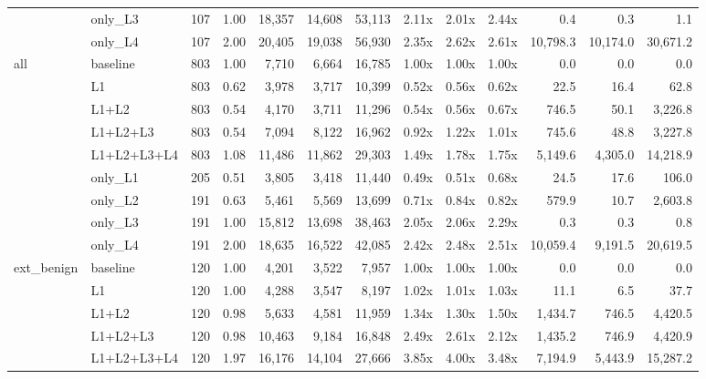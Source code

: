 \begin{tabular}{llrrrrrrrrrrr}
 & only\_L3 & 107 & 1.00 & 18,357 & 14,608 & 53,113 & 2.11x & 2.01x & 2.44x & 0.4 & 0.3 & 1.1 \\
 & only\_L4 & 107 & 2.00 & 20,405 & 19,038 & 56,930 & 2.35x & 2.62x & 2.61x & 10,798.3 & 10,174.0 & 30,671.2 \\
\midrule
all & baseline & 803 & 1.00 & 7,710 & 6,664 & 16,785 & 1.00x & 1.00x & 1.00x & 0.0 & 0.0 & 0.0 \\
 & L1 & 803 & 0.62 & 3,978 & 3,717 & 10,399 & 0.52x & 0.56x & 0.62x & 22.5 & 16.4 & 62.8 \\
 & L1+L2 & 803 & 0.54 & 4,170 & 3,711 & 11,296 & 0.54x & 0.56x & 0.67x & 746.5 & 50.1 & 3,226.8 \\
 & L1+L2+L3 & 803 & 0.54 & 7,094 & 8,122 & 16,962 & 0.92x & 1.22x & 1.01x & 745.6 & 48.8 & 3,227.8 \\
 & L1+L2+L3+L4 & 803 & 1.08 & 11,486 & 11,862 & 29,303 & 1.49x & 1.78x & 1.75x & 5,149.6 & 4,305.0 & 14,218.9 \\
 & only\_L1 & 205 & 0.51 & 3,805 & 3,418 & 11,440 & 0.49x & 0.51x & 0.68x & 24.5 & 17.6 & 106.0 \\
 & only\_L2 & 191 & 0.63 & 5,461 & 5,569 & 13,699 & 0.71x & 0.84x & 0.82x & 579.9 & 10.7 & 2,603.8 \\
 & only\_L3 & 191 & 1.00 & 15,812 & 13,698 & 38,463 & 2.05x & 2.06x & 2.29x & 0.3 & 0.3 & 0.8 \\
 & only\_L4 & 191 & 2.00 & 18,635 & 16,522 & 42,085 & 2.42x & 2.48x & 2.51x & 10,059.4 & 9,191.5 & 20,619.5 \\
\midrule
ext\_benign & baseline & 120 & 1.00 & 4,201 & 3,522 & 7,957 & 1.00x & 1.00x & 1.00x & 0.0 & 0.0 & 0.0 \\
 & L1 & 120 & 1.00 & 4,288 & 3,547 & 8,197 & 1.02x & 1.01x & 1.03x & 11.1 & 6.5 & 37.7 \\
 & L1+L2 & 120 & 0.98 & 5,633 & 4,581 & 11,959 & 1.34x & 1.30x & 1.50x & 1,434.7 & 746.5 & 4,420.5 \\
 & L1+L2+L3 & 120 & 0.98 & 10,463 & 9,184 & 16,848 & 2.49x & 2.61x & 2.12x & 1,435.2 & 746.9 & 4,420.9 \\
 & L1+L2+L3+L4 & 120 & 1.97 & 16,176 & 14,104 & 27,666 & 3.85x & 4.00x & 3.48x & 7,194.9 & 5,443.9 & 15,287.2 \\
\bottomrule
\end{tabular}
